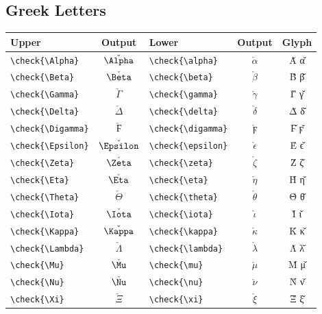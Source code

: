 \documentclass[12pt,a4paper]{article}
\begin{document}
\subsection*{Greek Letters}
\begin{longtable}{|l|c|l|c|c|}
\hline
\textbf{Upper}             & \textbf{Output}    & \textbf{Lower}             & \textbf{Output}       & \textbf{Glyph} \\
\hline
\verb|\check{\Alpha}|      & $\check{\Alpha}$   & \verb|\check{\alpha}|      & $\check{\alpha}$      & Α̌ α̌ \\
\verb|\check{\Beta}|       & $\check{\Beta}$    & \verb|\check{\beta}|       & $\check{\beta}$       & Β̌ β̌ \\
\verb|\check{\Gamma}|      & $\check{\Gamma}$   & \verb|\check{\gamma}|      & $\check{\gamma}$      & Γ̌ γ̌ \\
\verb|\check{\Delta}|      & $\check{\Delta}$   & \verb|\check{\delta}|      & $\check{\delta}$      & Δ̌ δ̌ \\
\verb|\check{\Digamma}|    & $\check{\Digamma}$ & \verb|\check{\digamma}|    & $\check{\digamma}$    & Ϝ̌ ϝ̌ \\
\verb|\check{\Epsilon}|    & $\check{\Epsilon}$ & \verb|\check{\epsilon}|    & $\check{\epsilon}$    & Ε̌ ϵ̌ \\
\verb|\check{\Zeta}|       & $\check{\Zeta}$    & \verb|\check{\zeta}|       & $\check{\zeta}$       & Ζ̌ ζ̌ \\
\verb|\check{\Eta}|        & $\check{\Eta}$     & \verb|\check{\eta}|        & $\check{\eta}$        & Η̌ η̌ \\
\verb|\check{\Theta}|      & $\check{\Theta}$   & \verb|\check{\theta}|      & $\check{\theta}$      & Θ̌ θ̌ \\
\verb|\check{\Iota}|       & $\check{\Iota}$    & \verb|\check{\iota}|       & $\check{\iota}$       & Ι̌ ι̌ \\
\verb|\check{\Kappa}|      & $\check{\Kappa}$   & \verb|\check{\kappa}|      & $\check{\kappa}$      & Κ̌ κ̌ \\
\verb|\check{\Lambda}|     & $\check{\Lambda}$  & \verb|\check{\lambda}|     & $\check{\lambda}$     & Λ̌ λ̌ \\
\verb|\check{\Mu}|         & $\check{\Mu}$      & \verb|\check{\mu}|         & $\check{\mu}$         & Μ̌ μ̌ \\
\verb|\check{\Nu}|         & $\check{\Nu}$      & \verb|\check{\nu}|         & $\check{\nu}$         & Ν̌ ν̌ \\
\verb|\check{\Xi}|         & $\check{\Xi}$      & \verb|\check{\xi}|         & $\check{\xi}$         & Ξ̌ ξ̌ \\

\end{longtable}
\end{document}
